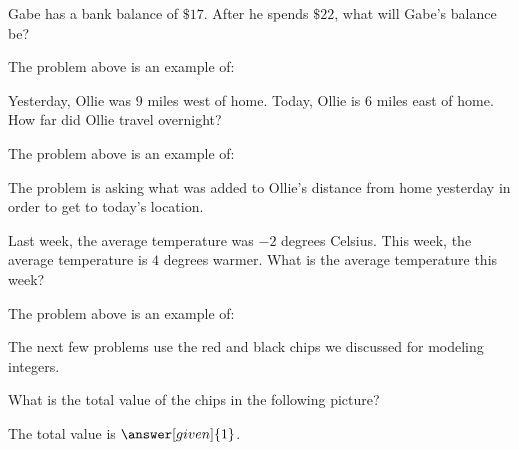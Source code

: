 \documentclass[nooutcomes]{ximera}
\begin{document}
\begin{problem}
Gabe has a bank balance of $\$17$.  After he spends $\$22$, what will Gabe's balance be?
\begin{prompt}
The problem above is an example of:
\begin{multipleChoice}
\end{multipleChoice}
\end{prompt}
\end{problem}


\begin{problem}
Yesterday, Ollie was $9$ miles west of home.  Today, Ollie is $6$ miles east of home.  How far did Ollie travel overnight?
\begin{prompt}
The problem above is an example of:
\begin{multipleChoice}
\end{multipleChoice}
\end{prompt}
\begin{hint}
The problem is asking what was added to Ollie's distance from home yesterday in order to get to today's location.
\end{hint}
\end{problem}


\begin{problem}
Last week, the average temperature was $-2$ degrees Celsius.  This week, the average temperature is $4$ degrees warmer.  What is the average temperature this week?
\begin{prompt}
The problem above is an example of:
\begin{multipleChoice}
\end{multipleChoice}
\end{prompt}
\end{problem}


The next few problems use the red and black chips we discussed for modeling integers.

\begin{problem}
What is the total value of the chips in the following picture?
\begin{center}  \end{center}

\begin{prompt}
The total value is $\answer[given]{1}$.
\end{prompt}

\end{problem}
\end{document}
